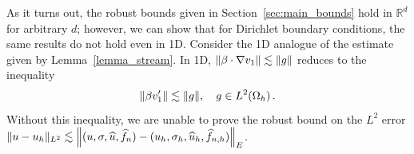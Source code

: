 As it turns out, the robust bounds given in Section~\ref{sec:main_bounds} hold in $\mathbb{R}^d$ for arbitrary $d$; however, we can show that for Dirichlet boundary conditions, the same results do not hold even in 1D.  
%
Consider the 1D analogue of the estimate given by Lemma~\ref{lemma_stream}.  In 1D, $\|\beta\cdot\grad v_1\| \lesssim \|g\|$ reduces to the inequality 
\[
\|\beta v_1'\|\lesssim \|g\|, \quad g\in L^2\!\left(\Oh\right).
\]
Without this inequality, we are unable to prove the robust bound on the $L^2$ error $\|u-u_h\|_{L^2} \lesssim \nor{(u,\sigma,\widehat{u},\widehat{f}_n)-(u_h,\sigma_h,\widehat{u}_h,\widehat{f}_{n,h})}_E$.

